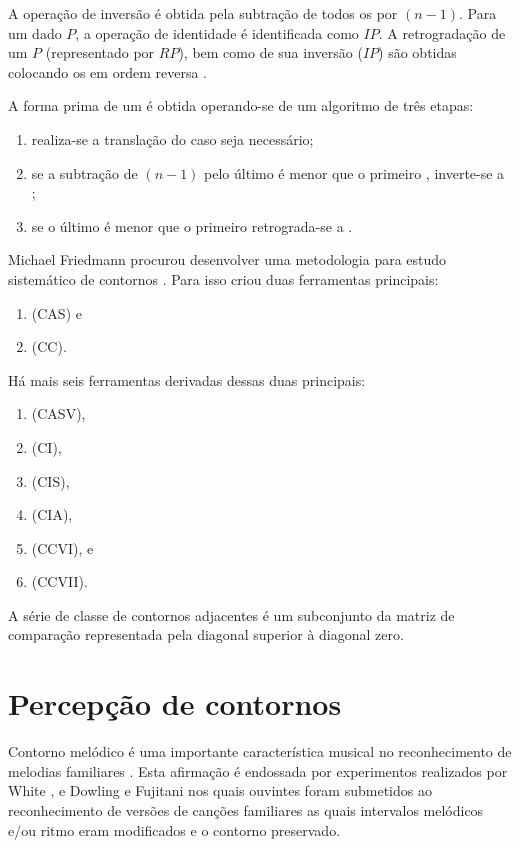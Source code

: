 A operação de inversão é obtida pela subtração de todos os
 por $(n-1)$. Para um dado  $P$, a
operação de identidade é identificada como $IP$. A retrogradação de um
 $P$ (representado por $RP$), bem como de sua inversão
($IP$) são obtidas colocando os  em ordem reversa
\cite[p. 231]{marvin.ea87:relating}.

A forma prima de um  é obtida operando-se de um
algoritmo de três etapas:
\begin{enumerate}
\item realiza-se a translação do  caso seja necessário;
\item se a subtração de $(n-1)$ pelo último  é menor
  que o primeiro , inverte-se a ;
\item se o último  é menor que o primeiro
   retrograda-se a .
\end{enumerate}

Michael Friedmann procurou desenvolver uma metodologia para estudo
sistemático de contornos \cite{friedmann85:methodology}. Para isso
criou duas ferramentas principais:

\begin{enumerate}
\item {} (CAS) e
\item {} (CC).
\end{enumerate}

Há mais seis ferramentas derivadas dessas duas principais:

\begin{enumerate}
\item {} (CASV),
\item {} (CI),
\item {} (CIS),
\item {} (CIA),
\item {} (CCVI), e
\item {} (CCVII).
\end{enumerate}

A série de classe de contornos adjacentes é um subconjunto da matriz
de comparação representada pela diagonal superior à diagonal zero.

\section{Percepção de contornos}
\label{sec:perc-de-cont}

Contorno melódico é uma importante característica musical no
reconhecimento de melodias familiares
\cite[p. 136]{dowling.ea86:music}. Esta afirmação é endossada por
experimentos realizados por White \cite{white60:recognition}, e
Dowling e Fujitani \cite{dowling.ea71:contour} nos quais ouvintes
foram submetidos ao reconhecimento de versões de canções familiares as
quais intervalos melódicos e/ou ritmo eram modificados e o contorno
preservado.

